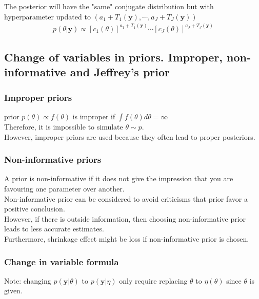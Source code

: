     The posterior will have the "same" conjugate
    distribution but with hyperparameter updated to
    $(a_1+T_1(\mathbf{y}), \cdots, a_J + T_J(\mathbf{y}))$
    \begin{align*}
        p(\theta|\mathbf{y}) \propto
        [c_1(\theta)]^{a_1+T_1(\mathbf{y})}
        \cdots
        [c_J(\theta)]^{a_J+T_J(\mathbf{y})}
    \end{align*}

    \subsection{Change of variables in priors. Improper,
    non-informative and Jeffrey's prior}

    \subsubsection{Improper priors}
    prior $p(\theta)\propto f(\theta)$ is improper if $\int
    f(\theta) d\theta = \infty$\\
    Therefore, it is impossible to simulate $\theta \sim p$.\\
    However, improper priors are used because they often
    lead to proper posteriors.

    \subsubsection{Non-informative priors}

    A prior is non-informative if it does not give the
    impression that you are favouring one parameter over
    another.\\
    Non-informative prior can be considered to avoid
    criticisms that prior favor a positive conclusion.\\
    However, if there is outside information, then choosing
    non-informative prior leads to less accurate
    estimates.\\
    Furthermore, shrinkage effect might be loss if
    non-informative prior is chosen.

    \subsubsection{Change in variable formula}

    Note: changing $p(\mathbf{y}|\theta)$ to 
    $p(\mathbf{y}|\eta)$ only require replacing $\theta$ to
    $\eta(\theta)$ since $\theta$ is given.

